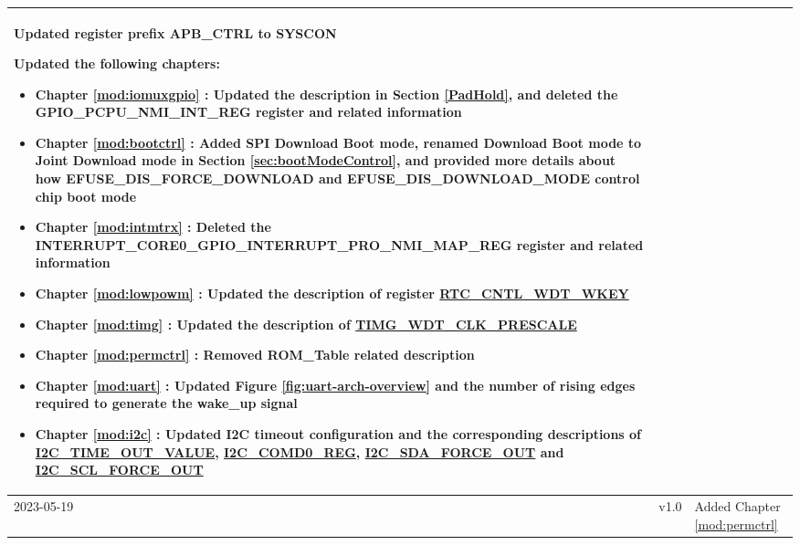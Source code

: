 \begin{longtable}[l]{ | m{2cm} | m{1.5cm} | m{12cm} | }
    Updated register prefix APB\_CTRL to SYSCON %

    Updated the following chapters:
        \begin{itemize}
            \item Chapter \ref{mod:iomuxgpio} \textit{\nameref{mod:iomuxgpio}}: Updated the description in Section \ref{PadHold}, and deleted the GPIO\_PCPU\_NMI\_INT\_REG register and related information %
            \item Chapter \ref{mod:bootctrl} \textit{\nameref{mod:bootctrl}}: Added SPI Download Boot mode, renamed Download Boot mode to Joint Download mode in Section \ref{sec:bootModeControl}, and provided more details about how EFUSE\_DIS\_FORCE\_DOWNLOAD and EFUSE\_DIS\_DOWNLOAD\_MODE control chip boot mode %
            \item Chapter \ref{mod:intmtrx} \textit{\nameref{mod:intmtrx}}: Deleted the INTERRUPT\_CORE0\_GPIO\_INTERRUPT\_PRO\_NMI\_MAP\_REG register and related information %
            \item Chapter \ref{mod:lowpowm} \textit{\nameref{mod:lowpowm}}: Updated the description of register \hyperref[fielddesc:RTCCNTLWDTWKEY]{RTC\_CNTL\_WDT\_WKEY}%
            \item Chapter \ref{mod:timg} \textit{\nameref{mod:timg}}: Updated the description of \hyperref[fielddesc:TIMGWDTCLKPRESCALE]{TIMG\_WDT\_CLK\_PRESCALE} %
            \item Chapter \ref{mod:permctrl} \textit{\nameref{mod:permctrl}}: Removed ROM\_Table related description %
            \item Chapter \ref{mod:uart} \textit{\nameref{mod:uart}}: Updated Figure \ref{fig:uart-arch-overview} \textit{\nameref{fig:uart-arch-overview}} and the number of rising edges required to generate the wake\_up signal %
            \item Chapter \ref{mod:i2c} \textit{\nameref{mod:i2c}}: Updated I2C timeout configuration and the corresponding descriptions of \hyperref[fielddesc:I2CTIMEOUTVALUE]{I2C\_TIME\_OUT\_VALUE}, \hyperref[regdesc:I2CCOMD0REG]{I2C\_COMD0\_REG}, \hyperref[fielddesc:I2CSDAFORCEOUT]{I2C\_SDA\_FORCE\_OUT} and \hyperref[fielddesc:I2CSCLFORCEOUT]{I2C\_SCL\_FORCE\_OUT}  %
        \end{itemize}
    \\\hline
    2023-05-19 & v1.0 &
        Added Chapter \ref{mod:permctrl} \textit{\nameref{mod:permctrl}}


\end{longtable}
